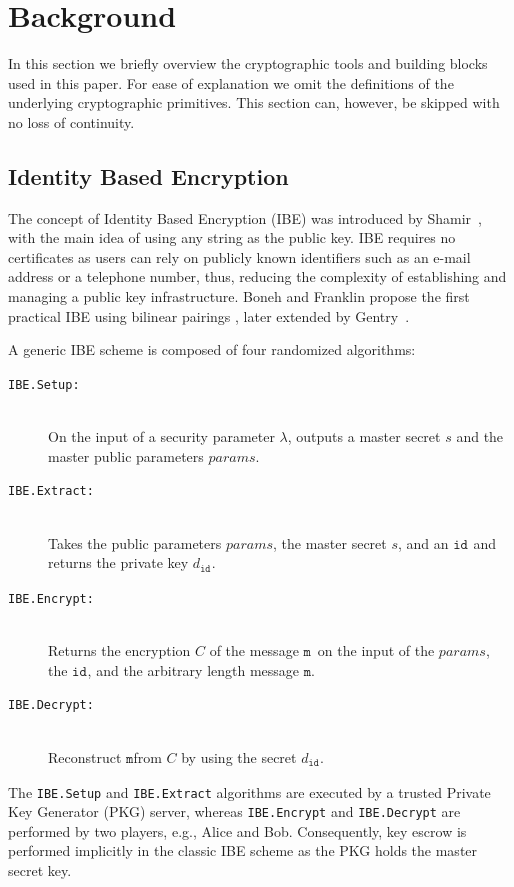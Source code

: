\documentclass[journal]{IEEEtran}
\newcommand{\msg}{\ensuremath{\mathtt{m}}}
\newcommand{\id}[1]{\ensuremath{\mathtt{id}_{#1}}}
\begin{document}
\section{Background}\label{sec:background}
In this section we briefly overview the cryptographic tools and building blocks used in this paper. For ease of explanation we omit the definitions of the underlying cryptographic primitives. This section 
can, however, be skipped with no loss of continuity.

\subsection{Identity Based Encryption}
The concept of Identity Based Encryption (IBE) was introduced by Shamir~\cite{DBLP:conf/crypto/Shamir84}, with the main idea of using any string as the public key. IBE requires no certificates as users can rely on publicly known identifiers such as an e-mail address or a telephone number, thus, reducing the complexity of establishing and managing a public key infrastructure. Boneh and Franklin propose the first practical IBE using bilinear pairings \cite{BonehFranklinIBE}, later extended by Gentry~\cite{GentryRandomOracles}. 

A generic IBE scheme is composed of four randomized algorithms:
\begin{description}
    \item[\texttt{IBE.Setup:}]~\\ On the input of a security parameter $\lambda$, outputs a master secret $s$ and the master public parameters $params$. 
    \item[\texttt{IBE.Extract:}]~\\ Takes the public parameters $params$, the master secret $s$, and an \id{} and returns the private key $d_{\id{}}$.
    \item[\texttt{IBE.Encrypt:}]~\\ Returns the encryption $C$ of the message \msg\ on the input of the $params$, the \id{}, and the arbitrary length message \msg. 
    \item[\texttt{IBE.Decrypt:}]~\\ Reconstruct \msg from $C$ by using the secret $d_{\id{}}$.
\end{description}

The \texttt{IBE.Setup} and \texttt{IBE.Extract} algorithms are executed by a trusted Private Key Generator (PKG) server, whereas \texttt{IBE.Encrypt} and \texttt{IBE.Decrypt} are performed by two players, e.g., Alice and Bob. Consequently, key escrow is performed implicitly in the classic IBE scheme as the PKG holds the master secret key.
\end{document}
